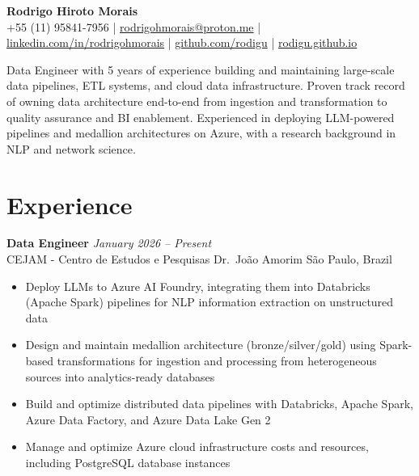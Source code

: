 \documentclass[11pt, a4paper]{article}
\begin{document}
\pagestyle{empty}

\begin{center}
    {\LARGE\bfseries Rodrigo Hiroto Morais}\\[4pt]
    +55 (11) 95841-7956 \;|\;
    \href{mailto:rodrigohmorais@proton.me}{rodrigohmorais@proton.me} \;|\;
    \href{https://linkedin.com/in/rodrigohmorais}{linkedin.com/in/rodrigohmorais} \;|\;
    \href{https://github.com/rodigu}{github.com/rodigu} \;|\;
    \href{https://rodigu.github.io}{rodigu.github.io}
\end{center}

\vspace{2pt}
Data Engineer with 5 years of experience building and maintaining large-scale data pipelines, ETL systems, and cloud data infrastructure. Proven track record of owning data architecture end-to-end from ingestion and transformation to quality assurance and BI enablement. Experienced in deploying LLM-powered pipelines and medallion architectures on Azure, with a research background in NLP and network science.

\section{Experience}

\textbf{Data Engineer} \hfill \textit{January 2026 -- Present}\\
CEJAM - Centro de Estudos e Pesquisas Dr.\ João Amorim \hfill São Paulo, Brazil
\begin{itemize}
    \item Deploy LLMs to Azure AI Foundry, integrating them into Databricks (Apache Spark) pipelines for NLP information extraction on unstructured data
    \item Design and maintain medallion architecture (bronze/silver/gold) using Spark-based transformations for ingestion and processing from heterogeneous sources into analytics-ready databases
    \item Build and optimize distributed data pipelines with Databricks, Apache Spark, Azure Data Factory, and Azure Data Lake Gen 2
    \item Manage and optimize Azure cloud infrastructure costs and resources, including PostgreSQL database instances
\end{itemize}
\end{document}
